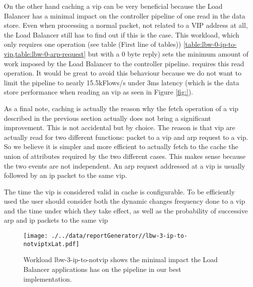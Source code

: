 On the other hand caching a \gls{vip} can be very beneficial because
the Load Balancer has a minimal impact on the controller pipeline of
one read in the data store. Even when processing a normal packet, not related to a VIP address at
all, the Load Balancer still has to find out if this is the case. This
workload, which only requires one operation (see table (First line of tables))
\ref{table:lbw-0-ip-to-vip,table:lbw-0-arp-request} but with  a 0 byte
reply) sets the minimum amount of work imposed by
the Load Balancer to the controller pipeline. 
requires this read operation. It would be great to avoid this
behaviour because we do not want to limit the pipeline to nearly 15.5kFlows/s
under 3ms latency (which is the data store performance when reading an
\gls{vip} as seen in Figure \ref{fig:}). 

As a final note, caching is actually the reason why the fetch
operation of a \gls{vip} described in the previous section actually
does not bring a significant improvement. This is not accidental but
by choice. The reason is that \gls{vip} are actually read for two
different functions: packet to a vip and arp request to a vip. So we
believe it is simpler and more efficient to actually fetch to the
cache the union of attributes required by the two different
cases. This makes sense because the two events are not independent. An
\gls{arp} request addressed at a \gls{vip} is usually followed by an
\gls{ip} packet to the same \gls{vip}.  

The time the \gls{vip} is considered valid in cache is
configurable. To be efficiently used the user should consider both the
dynamic changes frequency done to a \gls{vip} and the time under which
they take effect, as well as the probability of successive arp and ip
packets to the same \gls{vip}





\begin{figure}[ht]
\centering
\texttt{[image: ./../data/reportGenerator//lbw-3-ip-to-notviptxLat.pdf]}
\caption[Minimum impact of Load Balancer in the pipeline.]{Workload
  lbw-3-ip-to-notvip shows the minimal impact the Load Balancer
  applications has on the pipeline in our best implementation.}
\end{figure}



